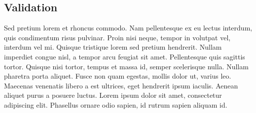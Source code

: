 \documentclass[11pt,a4paper]{article}
\begin{document}
\subsection{Validation}
Sed pretium lorem et rhoncus commodo. Nam pellentesque ex eu lectus interdum, quis condimentum risus pulvinar. Proin nisi neque, tempor in volutpat vel, interdum vel mi. Quisque tristique lorem sed pretium hendrerit. Nullam imperdiet congue nisl, a tempor arcu feugiat sit amet. Pellentesque quis sagittis tortor. Quisque nisi tortor, tempus et massa id, semper scelerisque nulla. Nullam pharetra porta aliquet. Fusce non quam egestas, mollis dolor ut, varius leo. Maecenas venenatis libero a est ultrices, eget hendrerit ipsum iaculis. Aenean aliquet purus a posuere luctus. Lorem ipsum dolor sit amet, consectetur adipiscing elit. Phasellus ornare odio sapien, id rutrum sapien aliquam id.
\end{document}
